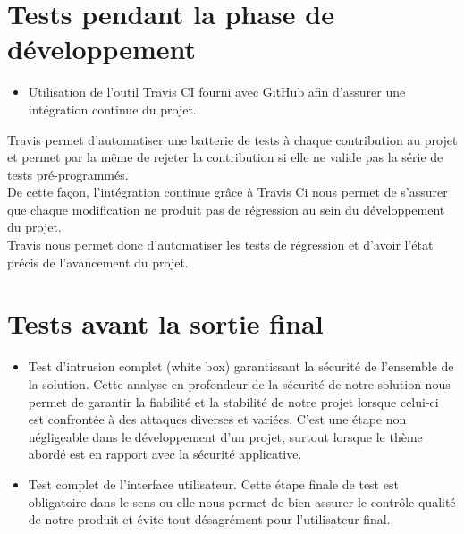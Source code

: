 \section{Tests pendant la phase de développement}
\begin{itemize}
\item Utilisation de l'outil Travis CI fourni avec GitHub afin d'assurer une intégration continue du projet.\\
\end{itemize}
Travis permet d'automatiser une batterie de tests à chaque contribution au projet et permet par la même de rejeter la contribution si elle ne valide pas la série de tests pré-programmés.\\
De cette façon, l'intégration continue grâce à Travis Ci nous permet de s'assurer que chaque modification ne produit pas de régression au sein du développement du projet.\\

 
Travis nous permet donc d'automatiser les tests de régression et d'avoir l'état précis de l'avancement du projet.\\

\section{Tests avant la sortie final}
\begin{itemize}
\item Test d'intrusion complet (white box) garantissant la sécurité de l'ensemble de la solution. Cette analyse en profondeur de la sécurité de notre solution nous permet de garantir la fiabilité et la stabilité de notre projet lorsque celui-ci est confrontée à des attaques diverses et variées. C'est une étape non négligeable dans le développement d'un projet, surtout lorsque le thème abordé est en rapport avec la sécurité applicative.\\
\item Test complet de l'interface utilisateur. Cette étape finale de test est obligatoire dans le sens ou elle nous permet de bien assurer le contrôle qualité de notre produit et évite tout désagrément pour l'utilisateur final.\\
\end{itemize}